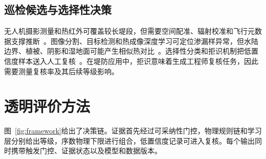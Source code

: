 \documentclass[10pt,twocolumn,a4paper]{ctexart}
\begin{document}
\subsection{巡检候选与选择性决策}
无人机摄影测量和热红外可覆盖较长堤段，但需要空间配准、辐射校准和飞行元数据支撑推断~\cite{Colomina2014}。图像分割、目标检测和热成像深度学习可定位渗漏样异常，但水陆边界、植被、阴影和湿地面可能产生相似热对比~\cite{Ronneberger2015,Redmon2016,Kumar2025}。选择性分类和拒识机制把低置信度样本送入人工复核~\cite{Chow1970,Geifman2017}。在堤防应用中，拒识意味着生成工程师复核任务，因此需要测量复核率及其后续等级影响。

\section{透明评价方法}
图~\ref{fig:framework}给出了决策链。证据首先经过可采纳性门控，物理规则链和学习层分别给出等级，序数物理下限进行组合，低置信度记录可进入复核。每个输出同时携带触发门控、证据状态以及模型和数据版本。
\end{document}
